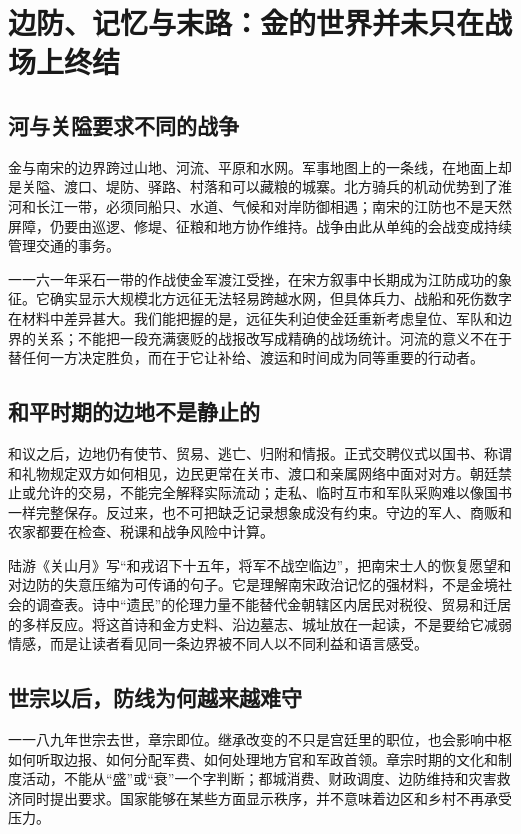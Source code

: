 \section{边防、记忆与末路：金的世界并未只在战场上终结}

\subsection{河与关隘要求不同的战争}

金与南宋的边界跨过山地、河流、平原和水网。军事地图上的一条线，在地面上却是关隘、渡口、堤防、驿路、村落和可以藏粮的城寨。北方骑兵的机动优势到了淮河和长江一带，必须同船只、水道、气候和对岸防御相遇；南宋的江防也不是天然屏障，仍要由巡逻、修堤、征粮和地方协作维持。战争由此从单纯的会战变成持续管理交通的事务。

一一六一年采石一带的作战使金军渡江受挫，在宋方叙事中长期成为江防成功的象征。它确实显示大规模北方远征无法轻易跨越水网，但具体兵力、战船和死伤数字在材料中差异甚大。我们能把握的是，远征失利迫使金廷重新考虑皇位、军队和边界的关系；不能把一段充满褒贬的战报改写成精确的战场统计。河流的意义不在于替任何一方决定胜负，而在于它让补给、渡运和时间成为同等重要的行动者。

\subsection{和平时期的边地不是静止的}

和议之后，边地仍有使节、贸易、逃亡、归附和情报。正式交聘仪式以国书、称谓和礼物规定双方如何相见，边民更常在关市、渡口和亲属网络中面对对方。朝廷禁止或允许的交易，不能完全解释实际流动；走私、临时互市和军队采购难以像国书一样完整保存。反过来，也不可把缺乏记录想象成没有约束。守边的军人、商贩和农家都要在检查、税课和战争风险中计算。

陆游《关山月》写“和戎诏下十五年，将军不战空临边”，把南宋士人的恢复愿望和对边防的失意压缩为可传诵的句子。它是理解南宋政治记忆的强材料，不是金境社会的调查表。诗中“遗民”的伦理力量不能替代金朝辖区内居民对税役、贸易和迁居的多样反应。将这首诗和金方史料、沿边墓志、城址放在一起读，不是要给它减弱情感，而是让读者看见同一条边界被不同人以不同利益和语言感受。

\subsection{世宗以后，防线为何越来越难守}

一一八九年世宗去世，章宗即位。继承改变的不只是宫廷里的职位，也会影响中枢如何听取边报、如何分配军费、如何处理地方官和军政首领。章宗时期的文化和制度活动，不能从“盛”或“衰”一个字判断；都城消费、财政调度、边防维持和灾害救济同时提出要求。国家能够在某些方面显示秩序，并不意味着边区和乡村不再承受压力。

